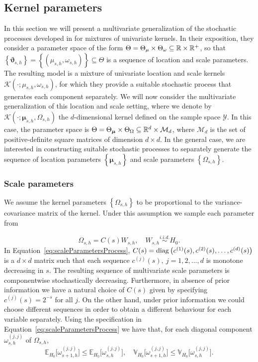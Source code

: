 \documentclass[nonatbib]{elsarticle}
\begin{document}
\subsection{Kernel parameters}\label{sec:kernel-parameters}
In this section we will present a multivariate generalization of the stochastic processes developed in \textcite{stefanucci2021} for mixtures of univariate kernels.
In their exposition, they consider a parameter space of the form $\Theta = \Theta_\mu \times \Theta_{\omega} \subseteq \mathbb{R} \times \mathbb{R}^+  $, so that $\left\{ \bm{\vartheta}_{s,h} \right\} = \left\{ (\mu_{s,h}, \omega_{s,h}) \right\} \subseteq \Theta$ is a sequence of location and scale parameters.
The resulting model is a mixture of univariate location and scale kernels $\mathcal{K}(\cdot ; \mu_{s,h}, \omega_{s,h})$, for which they provide a suitable stochastic process that generates each component separately.
We will now consider the multivariate generalization of this location and scale setting, where we denote by $\mathcal{K}(\cdot ; \bm{\mu}_{s,h}, \Omega_{s,h})$ the $d$-dimensional kernel defined on the sample space $\mathcal{Y}$.
In this case, the parameter space is $\Theta = \Theta_{\bm{\mu}} \times \Theta_{\Omega} \subseteq \mathbb{R}^{d} \times \mathcal{M}_{d}$, where $\mathcal{M}_{d}$ is the set of positive-definite square matrices of dimension $d\times d$.
In the general case, we are interested in constructing suitable stochastic processes to separately generate the sequence of location parameters $\left\{ \bm{\mu}_{s,h} \right\}$ and scale parameters $\left\{ \Omega_{s,h} \right\}$.

\subsubsection{Scale parameters}\label{ssec:scale-parameters}
We assume the kernel parameters $\left\{ \Omega_{s,h} \right\}$ to be proportional to the variance-covariance matrix of the kernel.
Under this assumption we sample each parameter from

\begin{equation}
    \label{eq:scaleParametersProcess}
    \Omega_{s,h} = C(s) W_{s,h}, \quad W_{s,h} \overset{i.i.d.}{\sim } H_0.
\end{equation}
In Equation~\eqref{eq:scaleParametersProcess}, $C(s) = \operatorname{diag} \left( c^{(1)}(s), c^{(2)}(s), \ldots, c^{(d)}(s) \right)$ is a $d\times d$ matrix such that each sequence $c^{(j)}(s),\: j = 1, 2, \ldots, d$ is monotone decreasing in $s$.
The resulting sequence of multivariate scale parameters is componentwise stochastically decreasing.
Furthermore, in absence of prior information we have a natural choice of $C(s)$ given by specifying $c^{(j)}(s) = 2^{-s}$ for all $j$.
On the other hand, under prior information we could choose different sequences in order to obtain a different behaviour for each variable separately.
Using the specification in Equation~\eqref{eq:scaleParametersProcess} we have that, for each diagonal component $\omega^{(j,j)}_{s,h}$ of $\Omega_{s,h}$,
\[
    \mathbb{E}_{H_0}\big[ \omega^{(j,j)}_{s+1,h} \big] \le \mathbb{E}_{H_0}\big[ \omega^{(j,j)}_{s, h} \big], \quad 
    \mathbb{V}_{H_0}\big[ \omega^{(j,j)}_{s+1,h} \big] \le \mathbb{V}_{H_0}\big[ \omega^{(j,j)}_{s, h} \big].
\]
\end{document}

